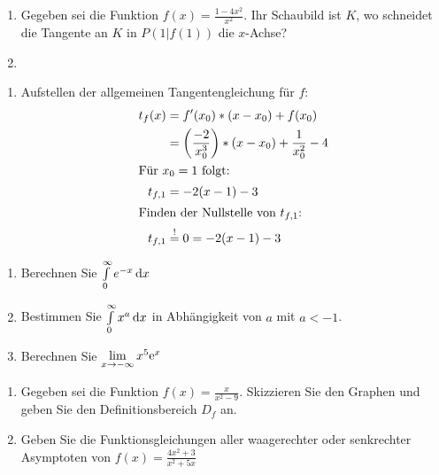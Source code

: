   \begin{enumerate}
    \item Gegeben sei die Funktion $f(x) = \frac{1-4x^2}{x^2}$. Ihr Schaubild ist $K$, wo schneidet die Tangente an $K$ in $P(1|f(1))$ die $x$-Achse?
		\item
  \end{enumerate}
	\begin{lsg}{}
		\begin{enumerate}
			\item Aufstellen der allgemeinen Tangentengleichung für $f$:
			\begin{align*}
				t_f(x)&=f'(x_0)*(x-x_0)+f(x_0)\\
							&=\left(\frac{-2}{x_0^3}\right)*(x-x_0)+\frac{1}{x_0^2}-4\\
				\intertext{Für $x_0=1$ folgt:}
				t_{f,1}&=-2(x-1)-3\\
				\intertext{Finden der Nullstelle von $t_{f,1}$:}
				t_{f,1}&\overset!=0=-2(x-1)-3\\
			\end{align*}
		\end{enumerate}
	\end{lsg}



	\begin{enumerate}
		\item Berechnen Sie $\int\limits^\infty_0 e^{-x}\,\mathrm{d} x$
		\item	Bestimmen Sie $\int\limits^\infty_0 x^a\,\mathrm{d} x$ in Abhängigkeit von $a$ mit $a < -1$.
		\item Berechnen Sie $\lim\limits_{x\rightarrow -\infty} x^5\mathrm{e}^x$
	\end{enumerate}

	\begin{enumerate}
		\item Gegeben sei die Funktion $f(x)=\frac{x}{x^2-9}$. Skizzieren Sie den Graphen und geben Sie den Definitionsbereich $D_f$ an.
		\item	Geben Sie die Funktionsgleichungen aller waagerechter oder senkrechter Asymptoten von $f(x)=\frac{4x^2+3}{x^2+5x}$
	\end{enumerate}

